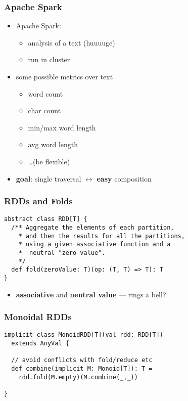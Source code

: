 \documentclass{beamer}
\begin{document}
\begin{frame}
  \frametitle{Apache Spark}
  \begin{itemize}
  \item Apache Spark:
    \begin{itemize}
    \item analysis of a text (huuuuge)
    \item run in cluster
    \end{itemize}
  \item some possible metrics over text
    \begin{itemize}
    \item word count
    \item char count
    \item min/max word length
    \item avg word length
    \item \dots (be flexible)
    \end{itemize}
  \item \textbf{goal}: single traversal $\leftrightarrow$ \textbf{easy} composition
  \end{itemize}
\end{frame}

\begin{frame}[fragile]
  \frametitle{RDDs and Folds}
\begin{verbatim}
abstract class RDD[T] {
  /** Aggregate the elements of each partition,
    * and then the results for all the partitions,
    * using a given associative function and a
    *  neutral "zero value".
    */
  def fold(zeroValue: T)(op: (T, T) => T): T
}
\end{verbatim}

  \begin{itemize}
  \item \textbf{associative} and \textbf{neutral value} --- rings a bell?
  \end{itemize}
\end{frame}

\begin{frame}[fragile]
  \frametitle{Monoidal RDDs}
\begin{verbatim}
implicit class MonoidRDD[T](val rdd: RDD[T])
  extends AnyVal {

  // avoid conflicts with fold/reduce etc
  def combine(implicit M: Monoid[T]): T =
    rdd.fold(M.empty)(M.combine(_,_))

}
\end{verbatim}
\end{frame}
\end{document}
